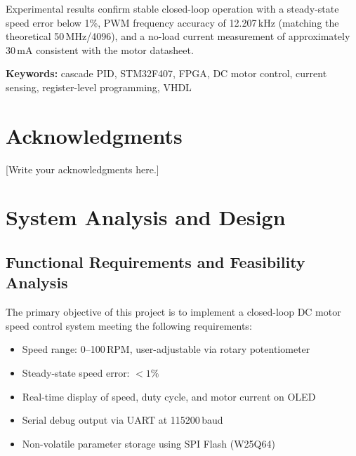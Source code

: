 \documentclass[12pt, a4paper]{report}
\begin{document}
Experimental results confirm stable closed-loop operation with a steady-state
speed error below 1\%, PWM frequency accuracy of 12.207\,kHz (matching the
theoretical 50\,MHz/4096), and a no-load current measurement of approximately
30\,mA consistent with the motor datasheet.

\vspace{1em}
\noindent\textbf{Keywords:} cascade PID, STM32F407, FPGA, DC motor control,
current sensing, register-level programming, VHDL

\chapter*{Acknowledgments}

[Write your acknowledgments here.]

\tableofcontents
\listoftables
\listoffigures

\chapter{System Analysis and Design}

\section{Functional Requirements and Feasibility Analysis}

The primary objective of this project is to implement a closed-loop DC motor
speed control system meeting the following requirements:

\begin{itemize}
    \item Speed range: 0--100\,RPM, user-adjustable via rotary potentiometer
    \item Steady-state speed error: $<1\%$
    \item Real-time display of speed, duty cycle, and motor current on OLED
    \item Serial debug output via UART at 115200\,baud
    \item Non-volatile parameter storage using SPI Flash (W25Q64)
\end{itemize}
\end{document}
